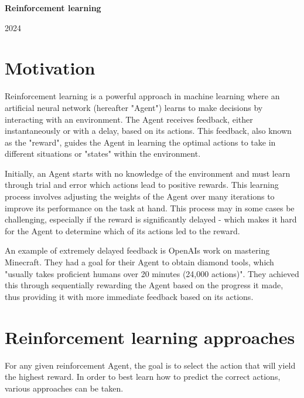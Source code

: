 \documentclass{article}
\begin{document}
\begin{center}
    \textbf{\LARGE Reinforcement learning}

    \vspace{0.2cm}
    
    2024

\end{center}

\section*{Motivation}

Reinforcement learning is a powerful approach in machine learning where an artificial neural network (hereafter "Agent") learns to make decisions by interacting with an environment. The Agent receives feedback, either instantaneously or with a delay, based on its actions. This feedback, also known as the "reward", guides the Agent in learning the optimal actions to take in different situations or "states" within the environment.

Initially, an Agent starts with no knowledge of the environment and must learn through trial and error which actions lead to positive rewards. This learning process involves adjusting the weights of the Agent over many iterations to improve its performance on the task at hand. This process may in some cases be challenging, especially if the reward is significantly delayed - which makes it hard for the Agent to determine which of its actions led to the reward.

An example of extremely delayed feedback is OpenAIs work on mastering Minecraft. They had a goal for their Agent to obtain diamond tools, which "usually takes proficient humans over 20 minutes (24,000 actions)". They achieved this through sequentially rewarding the Agent based on the progress it made, thus providing it with more immediate feedback based on its actions. \cite{Minecraft} 

\section*{Reinforcement learning approaches}

For any given reinforcement Agent, the goal is to select the action that will yield the highest reward. In order to best learn how to predict the correct actions, various approaches can be taken.
\end{document}
